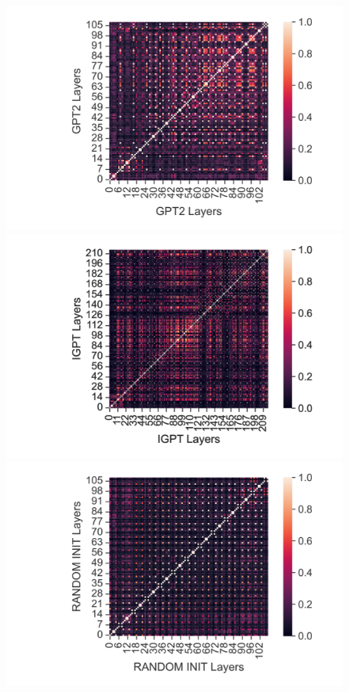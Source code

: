 \documentclass{article}
\begin{document}
\begin{figure}[H]
    \centering
    \begin{minipage}[b]{0.32\linewidth}
        \includegraphics[width=\linewidth]{figs/cka_40_40_gpt2gpt2_hopper_medium_666_action.png}
    \end{minipage}
    \begin{minipage}[b]{0.32\linewidth}
        \includegraphics[width=\linewidth]{figs/cka_40_40_igptigpt_hopper_medium_666_action.png}
    \end{minipage}
    \begin{minipage}[b]{0.32\linewidth}
        \includegraphics[width=\linewidth]{figs/cka_40_40_dtdt_hopper_medium_666_action.png}

\end{minipage}
\end{figure}
\end{document}
